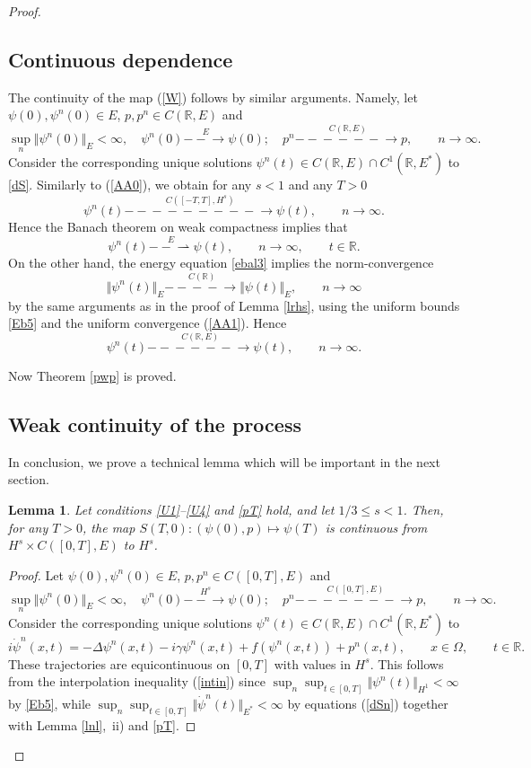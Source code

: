 \documentclass[11pt]{article}
\newtheorem{lemma}[theorem]{Lemma}
\newcommand{\R}{{\mathbb R}}
\newcommand{\st}{\stackrel}
\newcommand{\toEw}{\st{E}{-\!\!-\!\!\!\rightharpoonup}}
\newcommand{\toE}{\st{E}{-\!\!\!-\!\!\!\to}}
\newcommand{\toHs}{\st{H^s}{-\!\!\!-\!\!\!\to}}
\newcommand{\toCE}{\st{C(\R,E)}{-\!\!\!-\!\!\!-\!\!\!-\!\!\!-\!\!\!-\!\!\!\to}}
\newcommand{\toCTE}{\st{C([0,T],E)}{-\!\!\!-\!\!\!-\!\!\!-\!\!\!-\!\!\!-\!\!\!-\!\!\!\to}}
\newcommand{\toCHs}{\st{C([-T,T],H^s)}{-\!\!\!-\!\!\!-\!\!\!-\!\!\!-\!\!\!-\!\!\!-\!\!\!-\!\!\!-\!\!\!\to}}
\newcommand{\toC}{\st{C(\R)}{-\!\!\!-\!\!\!-\!\!-\!\!\!\to}}
\newcommand{\De}{\Delta}
\newcommand{\ga}{\gamma}
\newcommand{\Om}{\Omega}
\newcommand{\5}{{\hspace{0.5mm}}}
\numberwithin{equation}{section}
\newcommand{\la}{\label}
\newcommand{\be}{\begin{equation}}
\newcommand{\ee}{\end{equation}}
\newcommand{\bl}{\begin{lemma}}
\newcommand{\el}{\end{lemma}}
\numberwithin{equation}{section}
\begin{document}
\begin{proof}
\subsection{Continuous dependence}
 The continuity of the map (\ref{W}) follows by similar arguments. Namely, let $\psi(0), \psi^n(0)\in E$, $p,p^n\in C(\R, E)$ and
\be\la{wpp2}
\sup_n\Vert\psi^n(0)\Vert_E<\infty,\quad \psi^n(0) \toE \psi(0); \quad p^n \toCE p,\qquad n\to\infty.
\ee
Consider the corresponding unique solutions $\psi^n(t)\in C(\R,E)\cap C^1(\R,E^*)$ to \eqref{dS}. Similarly to (\ref{AA0}), we obtain for any $s<1$ and any $T>0$
\be\la{AA1}
\psi^n(t) \toCHs\psi(t),\qquad n\to\infty.
\ee
Hence the Banach theorem on weak compactness implies that
$$
\psi^n(t)\toEw\psi(t),\qquad n\to\infty,\qquad t\in\R.
$$
On the other hand, the energy equation \eqref{ebal3} implies the norm-convergence
$$
\Vert\psi^n(t)\Vert_E \toC\Vert\psi(t)\Vert_E,\qquad n\to\infty
$$
 by the same arguments as in the proof of Lemma \ref{lrhs}, using the uniform bounds \eqref{Eb5} and the uniform convergence (\ref{AA1}). Hence
 $$
\psi^n(t)\toCE\psi(t),\qquad n\to\infty.
$$

Now Theorem \ref{pwp} is proved.
\subsection{Weak continuity of the process}
In conclusion, we prove a technical lemma which will be important in the next section.
\bl\la{lw}
Let conditions \eqref{U1}--\eqref{U4} and \eqref{pT} hold, and let $1/3\le s<1$.
Then, for any $T>0$, the map $S(T,0):(\psi(0),p)\mapsto \psi(T)$ is continuous
from $H^s\times C([0,T],E)$ to $H^s$.
\el
\begin{proof}
Let $\psi(0), \psi^n(0)\in E$, $p,p^n\in C([0,T],E)$ and
\be\la{wpp}
\sup_n\Vert\psi^n(0)\Vert_E<\infty,\quad \psi^n(0) \toHs \psi(0); \quad p^n \toCTE p,\qquad n\to\infty.
\ee
Consider the corresponding unique solutions $\psi^n(t)\in C(\R,E)\cap C^1(\R,E^*)$ to
\be\la{dSn}
i\dot\psi^n(x,t)=-\De\psi^n(x,t)-i\ga\psi^n(x,t)+f(\psi^n(x,t))+p^n(x, t),\qquad x\in\Om,\qquad t\in\R.
\ee
These trajectories are equicontinuous on $[0,T]$ with values in $H^s$. This follows from the interpolation inequality (\ref{intin})
since $\sup_n \sup_{t\in [0,T]}\Vert\psi^n(t)\Vert_{H^1}<\infty$ by \eqref{Eb5},
while $\sup_n \sup_{t\in [0,T]}\Vert\dot \psi^n(t)\Vert_{E^*}<\infty$ by equations (\ref{dSn}) together with Lemma \ref{lnl},~ii) and \eqref{pT}.


\end{proof}
\end{proof}
\end{document}
